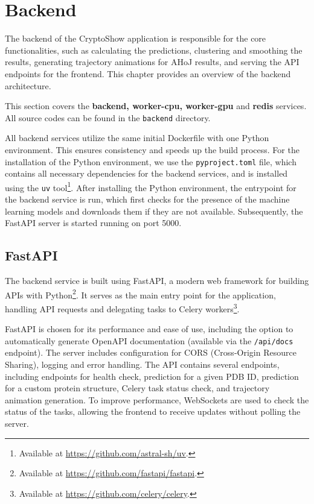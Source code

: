 \section{Backend}
\label{sec:backend}

The backend of the CryptoShow application is responsible for the core functionalities, such as calculating the predictions, clustering and smoothing the results, generating trajectory animations for AHoJ results, and serving the API endpoints for the frontend. This chapter provides an overview of the backend architecture.

This section covers the \textbf{backend, worker-cpu, worker-gpu} and \textbf{redis} services. All source codes can be found in the \lstinline!backend! directory.

All backend services utilize the same initial Dockerfile with one Python environment. This ensures consistency and speeds up the build process. For the installation of the Python environment, we use the \lstinline!pyproject.toml! file, which contains all necessary dependencies for the backend services, and is installed using the \lstinline|uv| tool\footnote{Available at \url{https://github.com/astral-sh/uv}.}. After installing the Python environment, the entrypoint for the backend service is run, which first checks for the presence of the machine learning models and downloads them if they are not available. Subsequently, the FastAPI server is started running on port 5000.

\subsection{FastAPI}
\label{sec:fastapi}

The backend service is built using FastAPI, a modern web framework for building APIs with Python\footnote{Available at \url{https://github.com/fastapi/fastapi}.}. It serves as the main entry point for the application, handling API requests and delegating tasks to Celery workers\footnote{Available at \url{https://github.com/celery/celery}.}.

FastAPI is chosen for its performance and ease of use, including the option to automatically generate OpenAPI documentation (available via the \lstinline|/api/docs| endpoint). The server includes configuration for CORS (Cross-Origin Resource Sharing), logging and error handling. The API contains several endpoints, including endpoints for health check, prediction for a given PDB ID, prediction for a custom protein structure, Celery task status check, and trajectory animation generation. To improve performance, WebSockets are used to check the status of the tasks, allowing the frontend to receive updates without polling the server.

